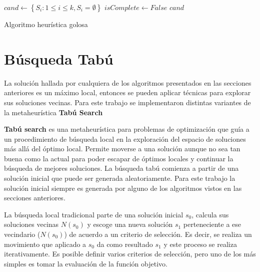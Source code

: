 \begin{center}
	\begin{algorithm}[H]
	\DontPrintSemicolon
	\SetAlgoLined
		$cand \leftarrow \left\{S_i: 1 \leq i \leq k, S_i = \emptyset\right\}$\;
		$isComplete \leftarrow False$\;
		\Return $cand$\;
	\caption{Algoritmo heurística golosa}\label{alg:algHeuGol}
	\end{algorithm}
\end{center}

\section{Búsqueda Tabú}
La solución hallada por cualquiera de los algoritmos presentados en las secciones anteriores es un máximo local, entonces se pueden aplicar técnicas para explorar sus soluciones vecinas. Para este trabajo se implementaron distintas variantes de la metaheurística \textbf{Tabú Search}

\textbf{Tabú search} \cite{tabuSearch} es una metaheurística para problemas de optimización que guía a un procedimiento de búsqueda local en la exploración del espacio de soluciones más allá del óptimo local. Permite moverse a una solución aunque no sea tan buena como la actual para poder escapar de óptimos locales y continuar la búsqueda de mejores soluciones. La búsqueda tabú comienza a partir de una solución inicial que puede ser generada aleatoriamente. Para este trabajo la solución inicial siempre es generada por alguno de los algoritmos vistos en las secciones anteriores.

La búsqueda local tradicional parte de una solución inicial $s_{0}$, calcula sus soluciones vecinas $N(s_{0})$ y escoge una nueva solución $s_{1}$ perteneciente a ese vecindario ($N(s_{0})$) de acuerdo a un criterio de selección. Es decir, se realiza un movimiento que aplicado a $s_{0}$ da como resultado $s_{1}$ y este proceso se realiza iterativamente. Es posible definir varios criterios de selección, pero uno de los más simples es tomar la evaluación de la función objetivo. 

